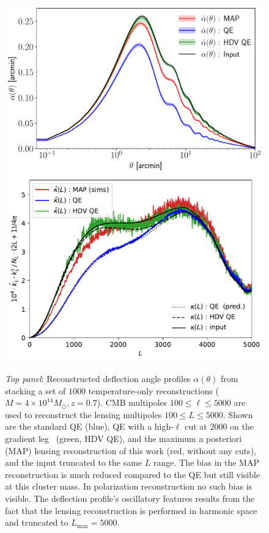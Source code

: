 \documentclass[prd, superscriptaddress, tightenlines, longbibliography, nofootinbib, eqsecnum, amsfonts, amsmath, floatfix, twocolumn, notitlepage]{revtex4-2}
\begin{document}
\begin{figure}[H]
	\label{fig:kappa_th}
	\hspace*{-0.5cm}
	\centering
	\includegraphics[width=0.95\hsize]{Figures/alpha_thet_lmax5k_out5k_M4.pdf}
	\includegraphics[width=0.92\hsize]{Figures/biascomp}
	\caption{\emph{Top panel}: Reconstructed deflection angle profiles $\alpha(\theta)$ from stacking a set of $1000$ temperature-only reconstructions ($M = 4 \times 10^{14} M_\odot, z=0.7$). CMB multipoles $100 \leq \ell \leq 5000$ are used to reconstruct the lensing multipoles $100 \leq L \leq 5000$. Shown are the standard QE (blue), QE with a high-$\ell$ cut at $2000$ on the gradient leg~\cite{Hu:2007bt} (green, HDV QE), and the maximum a posteriori (MAP) lensing reconstruction of this work (red, without any cuts), and the input truncated to the same $L$ range. The bias in the MAP reconstruction is much reduced compared to the QE but still visible at this cluster mass. In polarization reconstruction no such bias is visible. The deflection profile's oscillatory features results from the fact that the lensing reconstruction is performed in harmonic space and truncated to $L_{\text{max}}=5000$.
}
\end{figure}
\end{document}

